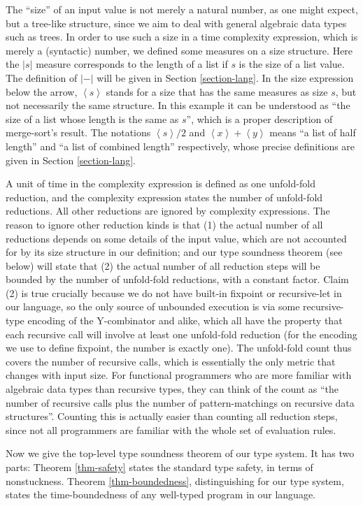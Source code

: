 \documentclass[preprint]{sigplanconf}
\newcommand{\Sstats}[1]{\left \langle #1 \right \rangle}
\begin{document}
The ``size'' of an input value is not merely a natural number, as one might expect, but a tree-like structure, since we aim to deal with general algebraic data types such as trees. In order to use such a size in a time complexity expression, which is merely a (syntactic) number, we defined some measures on a size structure. Here the $|s|$ measure corresponds to the length of a list if $s$ is the size of a list value. The definition of $|-|$ will be given in Section \ref{section-lang}. In the size expression below the arrow, $\Sstats{s}$ stands for a size that has the same measures as size $s$, but not necessarily the same structure. In this example it can be understood as ``the size of a list whose length is the same as $s$'', which is a proper description of merge-sort's result.  The notations $\Sstats{s}/2$ and $\Sstats{x}+\Sstats{y}$ means ``a list of half length'' and ``a list of combined length'' respectively, whose precise definitions are given in Section \ref{section-lang}.

A unit of time in the complexity expression is defined as one unfold-fold reduction, and the complexity expression states the number of unfold-fold reductions. All other reductions are ignored by complexity expressions. The reason to ignore other reduction kinds is that (1) the actual number of all reductions depends on some details of the input value, which are not accounted for by its size structure in our definition; and our type soundness theorem (see below) will state that (2) the actual number of all reduction steps will be bounded by the number of unfold-fold reductions, with a constant factor. Claim (2) is true crucially because we do not have built-in fixpoint or recursive-let in our language, so the only source of unbounded execution is via some recursive-type encoding of the Y-combinator and alike, which all have the property that each recursive call will involve at least one unfold-fold reduction (for the encoding we use to define fixpoint, the number is exactly one). The unfold-fold count thus covers the number of recursive calls, which is essentially the only metric that changes with input size. For functional programmers who are more familiar with algebraic data types than recursive types, they can think of the count as ``the number of recursive calls plus the number of pattern-matchings on recursive data structures''. Counting this is actually easier than counting all reduction steps, since not all programmers are familiar with the whole set of evaluation rules. 

Now we give the top-level type soundness theorem of our type system. It has two parts: Theorem \ref{thm-safety} states the standard type safety, in terms of nonstuckness. Theorem \ref{thm-boundedness}, distinguishing for our type system, states the time-boundedness of any well-typed program in our language.
\end{document}
